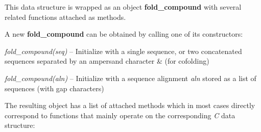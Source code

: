 \begin{DoxyRefList}
This data structure is wrapped as an object {\bfseries fold\+\_\+compound} with several related functions attached as methods.

A new {\bfseries fold\+\_\+compound} can be obtained by calling one of its constructors\+:~\newline

\begin{DoxyItemize}
\item {\itshape fold\+\_\+compound(seq)} -- Initialize with a single sequence, or two concatenated sequences separated by an ampersand character \textquotesingle{}\&\textquotesingle{} (for cofolding)
\item {\itshape fold\+\_\+compound(aln)} -- Initialize with a sequence alignment {\itshape aln} stored as a list of sequences (with gap characters)
\end{DoxyItemize}The resulting object has a list of attached methods which in most cases directly correspond to functions that mainly operate on the corresponding {\itshape C} data structure\+:~\newline


\end{DoxyRefList}
